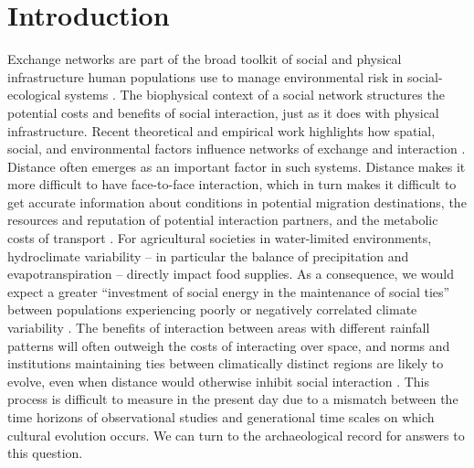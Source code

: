 \documentclass[10pt]{iopart}
\begin{document}
\section*{Introduction}
Exchange networks are part of the broad toolkit of social and physical infrastructure human populations use to manage environmental risk in social-ecological systems \parencite{Anderies2015}. The biophysical context of a social network structures the potential costs and benefits of social interaction, just as it does with physical infrastructure. Recent theoretical and empirical work highlights how spatial, social, and environmental factors influence networks of exchange and interaction \parencite{Fafchamps2007,Bloch2008,Nolin2010,Verdery2012,Freeman2014,Koster2014,Hao2015a,Schnegg2015}. Distance often emerges as an important factor in such systems. Distance makes it more difficult to have face-to-face interaction, which in turn makes it difficult to get accurate information about conditions in potential migration destinations, the resources and reputation of potential interaction partners, and the metabolic costs of transport \parencite{ostrom, Fafchamps2007, Anderies2011a, Drennan1984}. For agricultural societies in water-limited environments, hydroclimate variability -- in particular the balance of precipitation and evapotranspiration -- directly impact food supplies. As a consequence, we would expect a greater ``investment of social energy in the maintenance of social ties'' between populations experiencing poorly or negatively correlated climate variability \parencite{Rautman1993a}. The benefits of interaction between areas with different rainfall patterns will often outweigh the costs of interacting over space, and norms and institutions maintaining ties between climatically distinct regions are likely to evolve, even when distance would otherwise inhibit social interaction \parencite{Durante2009}. This process is difficult to measure in the present day due to a mismatch between the time horizons of observational studies and generational time scales on which cultural evolution occurs. We can turn to the archaeological record for answers to this question. 
\end{document}
